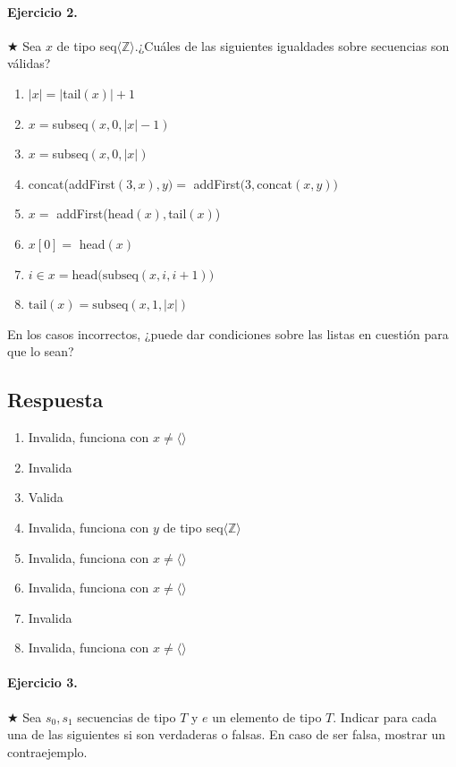 \documentclass[a4paper]{article}
\begin{document}
\paragraph{\textbf{Ejercicio 2.}} $\bigstar $ Sea $x$ de tipo seq$\langle \mathbb{Z}\rangle$.¿Cuáles de las siguientes igualdades sobre secuencias son válidas?

\begin{multicols}{2}
\begin{enumerate}[label=\alph*)]
\item $\vert x\vert =\vert $tail$(x)\vert +1$
\item $x=$subseq$(x,0,\vert x \vert -1)$
\item $x=$subseq$(x,0,\vert x \vert )$
\item concat(addFirst$(3,x),y)=$ addFirst$(3,$concat$(x,y))$
\item $x=$ addFirst(head$(x),$tail$(x)$)
\item $x[0]=$ head$(x)$
\item $i \in x=\textrm{head(subseq}(x,i,i+1))$
\item $\textrm{tail}(x)=\textrm{subseq}(x,1,\vert x \vert )$
\end{enumerate}
\end{multicols}
En los casos incorrectos, ¿puede dar condiciones sobre las listas en cuestión para que lo sean?
\subsection*{Respuesta}
\begin{multicols}{2}
\begin{enumerate}[label=\alph*)]
\item Invalida, funciona con $x \neq \langle \rangle$ 
\item Invalida
\item Valida
\item Invalida, funciona con $y$ de tipo seq$\langle \mathbb{Z}\rangle$
\item Invalida, funciona con $x \neq \langle \rangle$
\item Invalida, funciona con $x \neq \langle \rangle$
\item Invalida
\item Invalida, funciona con $x \neq \langle \rangle$
\end{enumerate}
\end{multicols}

\paragraph{Ejercicio 3.} $\bigstar$ Sea $s_0,s_1$ secuencias de tipo $T$ y $e$ un elemento de tipo $T$. Indicar para cada una de las siguientes si son verdaderas o falsas. En caso de ser falsa, mostrar un contraejemplo.
\end{document}
